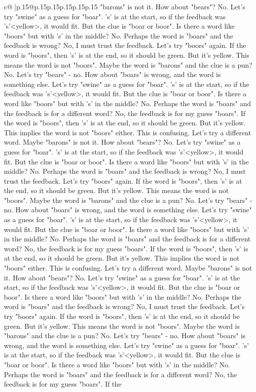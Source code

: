 \documentclass{article}
\begin{document}
{\begin{supertabular}{c@{$\;$}|p{.15\linewidth}@{}p{.15\linewidth}p{.15\linewidth}p{.15\linewidth}p{.15\linewidth}p{.15\linewidth}}
{{{"barons" is not it. How about "bears"? No. Let's try "swine" as a guess for "boar". 's' is at the start, so if the feedback was 's'<yellow>, it would fit. But the clue is "boar or boor". Is there a word like "boors" but with 's' in the middle? No. Perhaps the word is "boars" and the feedback is wrong? No, I must trust the feedback. Let's try "boors" again. If the word is "boors", then 's' is at the end, so it should be green. But it's yellow. This means the word is not "boors". Maybe the word is "barons" and the clue is a pun? No. Let's try "bears" {-} no. How about "boars" is wrong, and the word is something else. Let's try "swine" as a guess for "boar". 's' is at the start, so if the feedback was 's'<yellow>, it would fit. But the clue is "boar or boor". Is there a word like "boors" but with 's' in the middle? No. Perhaps the word is "boars" and the feedback is for a different word? No, the feedback is for my guess "boars". If the word is "boors", then 's' is at the end, so it should be green. But it's yellow. This implies the word is not "boors" either. This is confusing. Let's try a different word. Maybe "barons" is not it. How about "bears"? No. Let's try "swine" as a guess for "boar". 's' is at the start, so if the feedback was 's'<yellow>, it would fit. But the clue is "boar or boor". Is there a word like "boors" but with 's' in the middle? No. Perhaps the word is "boars" and the feedback is wrong? No, I must trust the feedback. Let's try "boors" again. If the word is "boors", then 's' is at the end, so it should be green. But it's yellow. This means the word is not "boors". Maybe the word is "barons" and the clue is a pun? No. Let's try "bears" {-} no. How about "boars" is wrong, and the word is something else. Let's try "swine" as a guess for "boar". 's' is at the start, so if the feedback was 's'<yellow>, it would fit. But the clue is "boar or boor". Is there a word like "boors" but with 's' in the middle? No. Perhaps the word is "boars" and the feedback is for a different word? No, the feedback is for my guess "boars". If the word is "boors", then 's' is at the end, so it should be green. But it's yellow. This implies the word is not "boors" either. This is confusing. Let's try a different word. Maybe "barons" is not it. How about "bears"? No. Let's try "swine" as a guess for "boar". 's' is at the start, so if the feedback was 's'<yellow>, it would fit. But the clue is "boar or boor". Is there a word like "boors" but with 's' in the middle? No. Perhaps the word is "boars" and the feedback is wrong? No, I must trust the feedback. Let's try "boors" again. If the word is "boors", then 's' is at the end, so it should be green. But it's yellow. This means the word is not "boors". Maybe the word is "barons" and the clue is a pun? No. Let's try "bears" {-} no. How about "boars" is wrong, and the word is something else. Let's try "swine" as a guess for "boar". 's' is at the start, so if the feedback was 's'<yellow>, it would fit. But the clue is "boar or boor". Is there a word like "boors" but with 's' in the middle? No. Perhaps the word is "boars" and the feedback is for a different word? No, the feedback is for my guess "boars". If the }}}
\end{supertabular}}
\end{document}

